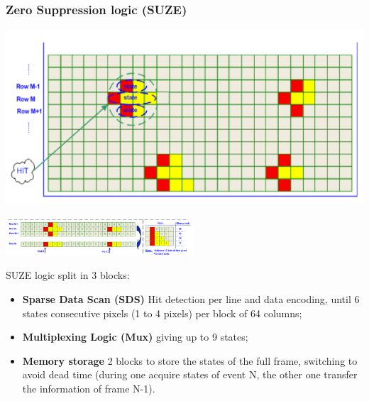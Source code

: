 \documentclass{beamer}
\newcommand{\grille}{
    \begin{tikzpicture}[overlay,remember picture]
        \begin{scope}[shift={(current page.south west)}]
            \draw[gray!50] (0,0) grid[step=2mm] (current page.north east);
            \draw[red!50] (0,0) grid[step=1cm] (current page.north east);
            \draw (0.2,1) node {1};
            \draw (0.2,2) node {2};
            \draw (0.2,3) node {3};
            \draw (0.2,4) node {4};
            \draw (0.2,5) node {5};
            \draw (0.2,6) node {6};
            \draw (0.2,7) node {7};
            \draw (0.2,8) node {8};
            \draw (0.2,9) node {9};
            \draw (1,0.5) node {1};
            \draw (2,0.5) node {2};
            \draw (3,0.5) node {3};
            \draw (4,0.5) node {4};
            \draw (5,0.5) node {5};
            \draw (6,0.5) node {6};
            \draw (7,0.5) node {7};
            \draw (8,0.5) node {8};
            \draw (9,0.5) node {9};
            \draw (10,0.5) node {10};
            \draw (11,0.5) node {11};
            \draw (12,0.5) node {12};
        \end{scope}
    \end{tikzpicture}
}
\begin{document}
  \begin{frame}[plain, label=suze]
    \frametitle{Zero Suppression logic (SUZE)}

    \vspace{-0.4cm}
    \begin{center}
        \includegraphics[width = 7 cm]{Pictures/suze_hitDetection.png}

        \includegraphics[width = 7cm]{Pictures/suze_hit2.png}
    \end{center}

    \vspace{-0.3cm}
    \scriptsize

    SUZE logic split in 3 blocks:
    \begin{itemize}
        \item \textbf{Sparse Data Scan (SDS)} Hit detection per line and data encoding, until 6 states consecutive pixels (1 to 4 pixels) per block of 64 columns;
        \item \textbf{Multiplexing Logic (Mux)} giving up to 9 states;
        \item \textbf{Memory storage} 2 blocks to store the states of the full frame, switching to avoid dead time (during one acquire states of event N, the other one transfer the information of frame N-1).
    \end{itemize}

  \end{frame}

\end{document}
